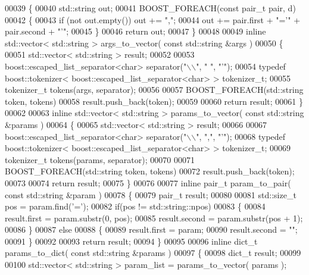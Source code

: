 \begin{DoxyCode}
00039 \{
00040     std::string out;
00041     BOOST\_FOREACH(\textcolor{keyword}{const} pair_t pair, d)
00042     \{
00043         \textcolor{keywordflow}{if} (not out.empty()) out += \textcolor{stringliteral}{","};
00044         out += pair.first + \textcolor{stringliteral}{"='"} + pair.second + \textcolor{stringliteral}{"'"};
00045     \}
00046     \textcolor{keywordflow}{return} out;
00047 \}
00048 
00049 \textcolor{keyword}{inline} std::vector< std::string > args_to_vector( \textcolor{keyword}{const} std::string &args )
00050 \{
00051   std::vector< std::string > result;
00052 
00053   boost::escaped\_list\_separator<char> separator(\textcolor{stringliteral}{"\(\backslash\)\(\backslash\)"}, \textcolor{stringliteral}{" "}, \textcolor{stringliteral}{"'"});
00054   \textcolor{keyword}{typedef} boost::tokenizer< boost::escaped\_list\_separator<char> > tokenizer\_t;
00055   tokenizer\_t tokens(args, separator);
00056 
00057   BOOST\_FOREACH(std::string token, tokens)
00058     result.push\_back(token);
00059 
00060   \textcolor{keywordflow}{return} result;
00061 \}
00062 
00063 \textcolor{keyword}{inline} std::vector< std::string > params_to_vector( \textcolor{keyword}{const} std::string &params )
00064 \{
00065   std::vector< std::string > result;
00066 
00067   boost::escaped\_list\_separator<char> separator(\textcolor{stringliteral}{"\(\backslash\)\(\backslash\)"}, \textcolor{stringliteral}{","}, \textcolor{stringliteral}{"'"});
00068   \textcolor{keyword}{typedef} boost::tokenizer< boost::escaped\_list\_separator<char> > tokenizer\_t;
00069   tokenizer\_t tokens(params, separator);
00070 
00071   BOOST\_FOREACH(std::string token, tokens)
00072     result.push\_back(token);
00073 
00074   \textcolor{keywordflow}{return} result;
00075 \}
00076 
00077 \textcolor{keyword}{inline} pair_t param_to_pair( \textcolor{keyword}{const} std::string &param )
00078 \{
00079   pair_t result;
00080 
00081   std::size\_t pos = param.find(\textcolor{charliteral}{'='});
00082   \textcolor{keywordflow}{if}(pos != std::string::npos)
00083   \{
00084     result.first = param.substr(0, pos);
00085     result.second = param.substr(pos + 1);
00086   \}
00087   \textcolor{keywordflow}{else}
00088   \{
00089     result.first = param;
00090     result.second = \textcolor{stringliteral}{""};
00091   \}
00092 
00093   \textcolor{keywordflow}{return} result;
00094 \}
00095 
00096 \textcolor{keyword}{inline} dict_t params_to_dict( \textcolor{keyword}{const} std::string &params )
00097 \{
00098   dict_t result;
00099 
00100   std::vector< std::string > param\_list = params_to_vector( params );

\end{DoxyCode}
